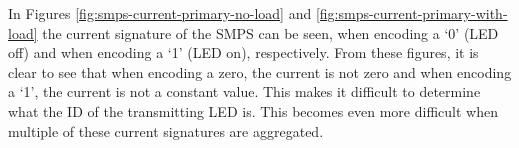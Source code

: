 In Figures \ref{fig:smps-current-primary-no-load} and \ref{fig:smps-current-primary-with-load} the current signature of the SMPS can be seen, when encoding a `0' (LED off) and when encoding a `1' (LED on), respectively.
From these figures, it is clear to see that when encoding a zero, the current is not zero and when encoding a `1', the current is not a constant value.
This makes it difficult to determine what the ID of the transmitting LED is.
This becomes even more difficult when multiple of these current signatures are aggregated.




